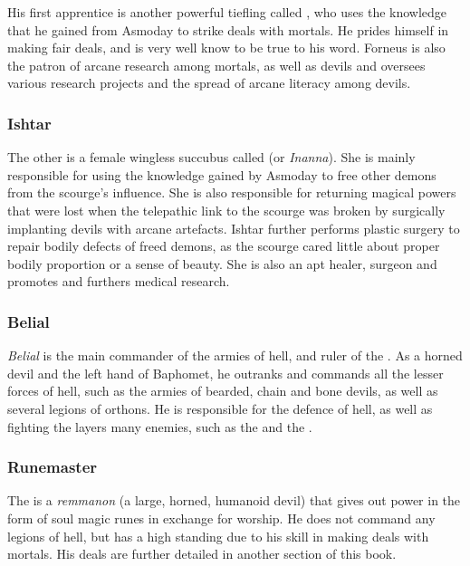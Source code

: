 His first apprentice is another powerful tiefling called
, who uses the knowledge that he gained from Asmoday to
strike deals with mortals. He prides himself in making fair deals, and is very
well know to be true to his word. Forneus is also the patron of arcane
research among mortals, as well as devils and oversees various research
projects and the spread of arcane literacy among devils.

\subsubsection{Ishtar}

The other is a female wingless succubus called  (or
\emph{Inanna}). She is mainly responsible for using the knowledge gained by
Asmoday to free other demons from the scourge's influence. She is also
responsible for returning magical powers that were lost when the telepathic
link to the scourge was broken by surgically implanting devils with arcane
artefacts.  Ishtar further performs plastic surgery to repair bodily defects
of freed demons, as the scourge cared little about proper bodily proportion or
a sense of beauty. She is also an apt healer, surgeon and promotes and
furthers medical research.

\subsubsection{Belial}
\label{sec:Belial}

\emph{Belial} is the main commander of the armies of hell, and ruler of the
. As a horned devil and the left hand of Baphomet, he
outranks and commands all the lesser forces of hell, such as the armies of
bearded, chain and bone devils, as well as several legions of orthons. He is
responsible for the defence of hell, as well as fighting the layers many
enemies, such as the  and the .

\subsubsection{Runemaster}

The  is a \emph{remmanon} (a large, horned, humanoid
devil) that gives out power in the form of soul magic runes in exchange for
worship. He does not command any legions of hell, but has a high standing due
to his skill in making deals with mortals. His deals are further detailed in
another section of this book.

